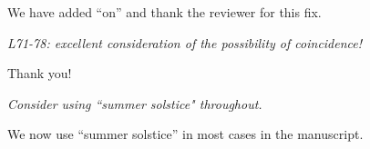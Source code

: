 \documentclass[11pt,letter]{article}
\begin{document}
We have added ``on'' and thank the reviewer for this fix.\\

\begin{mybox}
\emph{L71-78: excellent consideration of the possibility of coincidence!}
\end{mybox}

Thank you!\\

\begin{mybox}
\emph{Consider using ``summer solstice" throughout.}
\end{mybox}

We now use ``summer solstice'' in most cases in the manuscript.\\


\end{document}
